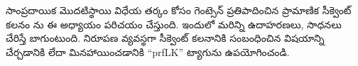 \documentclass[../../../include/open-logic-chapter]{subfiles}
\begin{document}
      {}
      {}

\begin{editorial}
  సాంప్రదాయిక మొదటిస్థాయి విధేయ తర్కం కోసం గెంట్సెన్ ప్రతిపాదించిన
  ప్రామాణిక సీక్వెంట్ కలనం ను ఈ అధ్యాయం పరిచయం చేస్తుంది. ఇందులో మరిన్ని
  ఉదాహరణలు, సాధనలు చేరిస్తే బాగుంటుంది. నిరూపణ వ్యవస్థగా సీక్వెంట్ కలనానికి
  సంబంధించిన విషయాన్ని చేర్చడానికి లేదా మినహాయించడానికి ``prfLK''
  ట్యాగును ఉపయోగించండి.
\end{editorial}














\OLEndChapterHook
\end{document}
